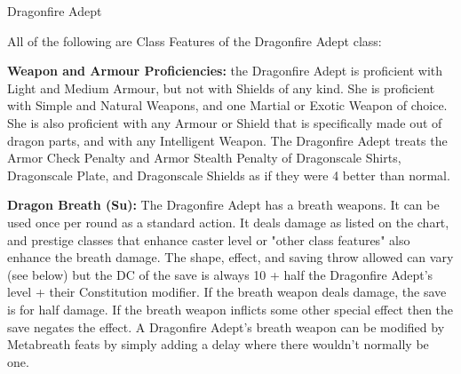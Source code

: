 \modebab{}
\goodfor{}
\goodref{}
\goodwil{}

\begin{extraclasstable}{Dragonfire Adept}{}
\end{extraclasstable}

\ClassFeatures
All of the following are Class Features of the Dragonfire Adept class:

\textbf{Weapon and Armour Proficiencies:} the Dragonfire Adept is proficient with Light and Medium Armour, but not with Shields of any kind. She is proficient with Simple and Natural Weapons, and one Martial or Exotic Weapon of choice. She is also proficient with any Armour or Shield that is specifically made out of dragon parts, and with any Intelligent Weapon. The Dragonfire Adept treats the Armor Check Penalty and Armor Stealth Penalty of Dragonscale Shirts, Dragonscale Plate, and Dragonscale Shields as if they were 4 better than normal.

\textbf{Dragon Breath (Su):} The Dragonfire Adept has a breath weapons. It can be used once per round as a standard action. It deals damage as listed on the chart, and prestige classes that enhance caster level or "other class features" also enhance the breath damage. The shape, effect, and saving throw allowed can vary (see below) but the DC of the save is always 10 + half the Dragonfire Adept's level + their Constitution modifier. If the breath weapon deals damage, the save is for half damage. If the breath weapon inflicts some other special effect then the save negates the effect. A Dragonfire Adept's breath weapon can be modified by Metabreath feats by simply adding a delay where there wouldn't normally be one.

